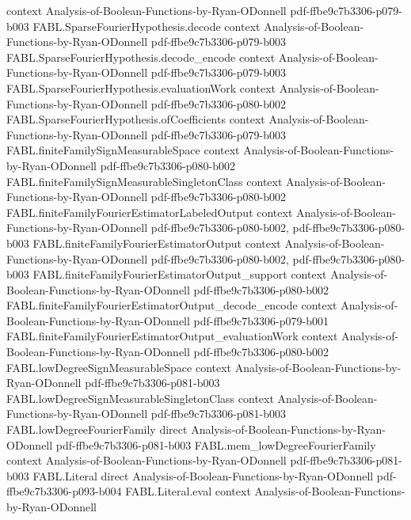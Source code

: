\begin{theorem}
  {context}
  {Analysis-of-Boolean-Functions-by-Ryan-ODonnell}
  {pdf-ffbe9c7b3306-p079-b003}
\proofstep
  {FABL.SparseFourierHypothesis.decode}
  {context}
  {Analysis-of-Boolean-Functions-by-Ryan-ODonnell}
  {pdf-ffbe9c7b3306-p079-b003}
\proofstep
  {FABL.SparseFourierHypothesis.decode_encode}
  {context}
  {Analysis-of-Boolean-Functions-by-Ryan-ODonnell}
  {pdf-ffbe9c7b3306-p079-b003}
\proofstep
  {FABL.SparseFourierHypothesis.evaluationWork}
  {context}
  {Analysis-of-Boolean-Functions-by-Ryan-ODonnell}
  {pdf-ffbe9c7b3306-p080-b002}
\proofstep
  {FABL.SparseFourierHypothesis.ofCoefficients}
  {context}
  {Analysis-of-Boolean-Functions-by-Ryan-ODonnell}
  {pdf-ffbe9c7b3306-p079-b003}
\proofstep
  {FABL.finiteFamilySignMeasurableSpace}
  {context}
  {Analysis-of-Boolean-Functions-by-Ryan-ODonnell}
  {pdf-ffbe9c7b3306-p080-b002}
\proofstep
  {FABL.finiteFamilySignMeasurableSingletonClass}
  {context}
  {Analysis-of-Boolean-Functions-by-Ryan-ODonnell}
  {pdf-ffbe9c7b3306-p080-b002}
\proofstep
  {FABL.finiteFamilyFourierEstimatorLabeledOutput}
  {context}
  {Analysis-of-Boolean-Functions-by-Ryan-ODonnell}
  {pdf-ffbe9c7b3306-p080-b002,
    pdf-ffbe9c7b3306-p080-b003}
\proofstep
  {FABL.finiteFamilyFourierEstimatorOutput}
  {context}
  {Analysis-of-Boolean-Functions-by-Ryan-ODonnell}
  {pdf-ffbe9c7b3306-p080-b002,
    pdf-ffbe9c7b3306-p080-b003}
\proofstep
  {FABL.finiteFamilyFourierEstimatorOutput_support}
  {context}
  {Analysis-of-Boolean-Functions-by-Ryan-ODonnell}
  {pdf-ffbe9c7b3306-p080-b002}
\proofstep
  {FABL.finiteFamilyFourierEstimatorOutput_decode_encode}
  {context}
  {Analysis-of-Boolean-Functions-by-Ryan-ODonnell}
  {pdf-ffbe9c7b3306-p079-b001}
\proofstep
  {FABL.finiteFamilyFourierEstimatorOutput_evaluationWork}
  {context}
  {Analysis-of-Boolean-Functions-by-Ryan-ODonnell}
  {pdf-ffbe9c7b3306-p080-b002}
\proofstep
  {FABL.lowDegreeSignMeasurableSpace}
  {context}
  {Analysis-of-Boolean-Functions-by-Ryan-ODonnell}
  {pdf-ffbe9c7b3306-p081-b003}
\proofstep
  {FABL.lowDegreeSignMeasurableSingletonClass}
  {context}
  {Analysis-of-Boolean-Functions-by-Ryan-ODonnell}
  {pdf-ffbe9c7b3306-p081-b003}
\proofstep
  {FABL.lowDegreeFourierFamily}
  {direct}
  {Analysis-of-Boolean-Functions-by-Ryan-ODonnell}
  {pdf-ffbe9c7b3306-p081-b003}
\proofstep
  {FABL.mem_lowDegreeFourierFamily}
  {context}
  {Analysis-of-Boolean-Functions-by-Ryan-ODonnell}
  {pdf-ffbe9c7b3306-p081-b003}
\proofstep
  {FABL.Literal}
  {direct}
  {Analysis-of-Boolean-Functions-by-Ryan-ODonnell}
  {pdf-ffbe9c7b3306-p093-b004}
\proofstep
  {FABL.Literal.eval}
  {context}
  {Analysis-of-Boolean-Functions-by-Ryan-ODonnell}

\end{theorem}
